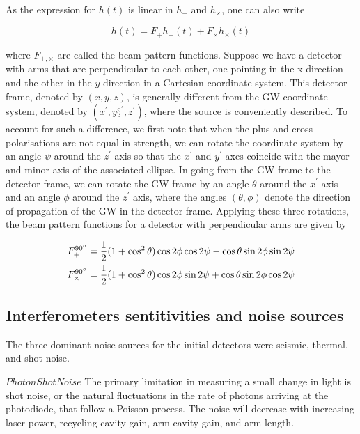 \documentclass[binding=0.6cm, LaM]{sapthesis}
\begin{document}
	As the expression for $h(t)$ is linear in $h_{+}$ and $h_{\times}$, one can also write

		\begin{equation}
		h(t) = F_{+}h_{+} (t) + F_{\times}h_{\times}(t)
		\end{equation}

	where $F_{+,\times}$ are called the beam pattern functions. Suppose we have a detector 
	with arms that are perpendicular to each other, one pointing in the x-direction and the other
	in the $y$-direction in a Cartesian coordinate system. This detector frame, denoted by $(x,y,z)$, 
	is generally different from the GW coordinate system, denoted by $(x^\prime,y§^\prime,z^\prime)$, where the source
	is conveniently described. To account for such a difference, we first note that when the plus 
	and cross polarisations are not equal in strength, we can rotate the coordinate system by
	an angle $\psi$ around the $z^\prime$ axis so that the $x^\prime$ and $y^\prime$ axes 
	coincide with the mayor and minor axis of the associated ellipse.
 	In going from the GW frame to the detector frame, we can rotate the GW frame by 
	an angle $\theta$ around the $x^\prime$ axis and an angle $\phi$ around the $z^\prime$ axis,
	where the angles $(\theta, \phi)$ denote the direction of propagation of the GW in the detector frame.
	Applying these three rotations, the beam pattern functions for a detector with perpendicular arms are given by

		\begin{align}
		F_{+}^{\ang{90}}& = {1 \over 2} (1 + \cos^2 \theta)\cos 2\phi \cos 2 \psi - \cos \theta \sin2\phi \sin2\psi \\
		F_{\times}^{\ang{90}}& = {1 \over 2} (1 + \cos^2 \theta)\cos 2\phi \sin 2 \psi + \cos \theta \sin2\phi \cos2\psi
		\end{align}

\subsection{Interferometers sentitivities and noise sources}

	The three dominant noise sources for the initial detectors were seismic, thermal, and shot noise.

	$Photon Shot Noise$
	The primary limitation in measuring a small change in light is shot noise,
	or the natural fluctuations in the rate of photons arriving at the photodiode, 
	that follow a Poisson process. The noise will decrease with increasing laser power, 
	recycling cavity gain, arm cavity gain, and arm length.
\end{document}
